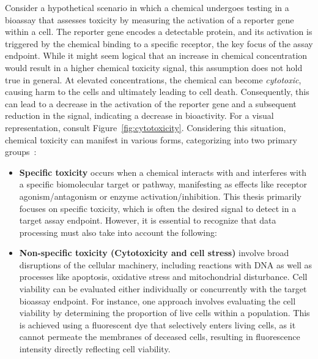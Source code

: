 Consider a hypothetical scenario in which a chemical undergoes testing in a bioassay that assesses toxicity by measuring the activation of a reporter gene within a cell. The reporter gene encodes a detectable protein, and its activation is triggered by the chemical binding to a specific receptor, the key focus of the assay endpoint. While it might seem logical that an increase in chemical concentration would result in a higher chemical toxicity signal, this assumption does not hold true in general. At elevated concentrations, the chemical can become \emph{cytotoxic}, causing harm to the cells and ultimately leading to cell death. Consequently, this can lead to a decrease in the activation of the reporter gene and a subsequent reduction in the signal, indicating a decrease in bioactivity. For a visual representation, consult Figure~\ref{fig:cytotoxicity}. Considering this situation, chemical toxicity can manifest in various forms, categorizing into two primary groups~\cite{judson2016}: 
\begin{itemize}
    \item \textbf{Specific toxicity} occurs when a chemical interacts with and interferes with a specific biomolecular target or pathway, manifesting as effects like receptor agonism/antagonism or enzyme activation/inhibition. This thesis primarily focuses on specific toxicity, which is often the desired signal to detect in a target assay endpoint. However, it is essential to recognize that data processing must also take into account the following:
    \item \textbf{Non-specific toxicity (Cytotoxicity and cell stress)} involve broad disruptions of the cellular machinery, including reactions with DNA as well as processes like apoptosis, oxidative stress and mitochondrial disturbance. Cell viability can be evaluated either individually or concurrently with the target bioassay endpoint. For instance, one approach involves evaluating the cell viability by determining the proportion of live cells within a population. This is achieved using a fluorescent dye that selectively enters living cells, as it cannot permeate the membranes of deceased cells, resulting in fluorescence intensity directly reflecting cell viability.
\end{itemize}

